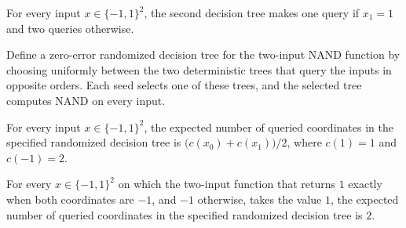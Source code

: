 \begin{theorem}
\label{FABL.nandTree10_queryCount}
\leanok
{}
For every input $x\in\{−1,1\}^2$, the second decision tree makes one query if $x_1=1$
and two queries otherwise.
\end{theorem}

\begin{definition}
\label{FABL.nandRandomizedTree}
\leanok
{}
Define a zero-error randomized decision tree for the two-input NAND function by choosing
uniformly between the two deterministic trees that query the inputs in opposite orders.
Each seed selects one of these trees, and the selected tree computes NAND on every
input.
\end{definition}

\begin{theorem}
\label{FABL.nandRandomizedTree_inputCost}
\leanok
{}
For every input $x\in\{-1,1\}^2$, the expected number of queried coordinates in the
specified randomized decision tree is $\bigl(c(x_0)+c(x_1)\bigr)/2$, where $c(1)=1$ and
$c(-1)=2$.
\end{theorem}

\begin{theorem}
\label{FABL.nandRandomizedTree_inputCost_of_eq_one}
\leanok
{}
For every $x\in\{-1,1\}^2$ on which the two-input function that returns $1$ exactly when
both coordinates are $-1$, and $-1$ otherwise, takes the value $1$, the expected number
of queried coordinates in the specified randomized decision tree is $2$.
\end{theorem}


